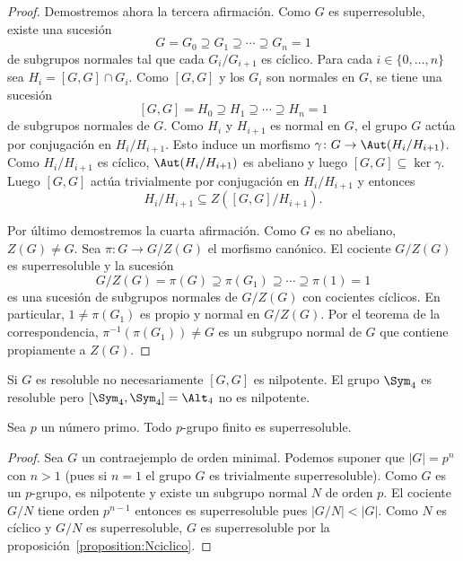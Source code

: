 \begin{proof}
	Demostremos ahora la tercera afirmación. Como $G$ es superresoluble, existe
	una sucesión
	\[
	G=G_0\supseteq G_1\supseteq\cdots\supseteq G_n=1
	\]
	de subgrupos normales tal que cada $G_i/G_{i+1}$ es cíclico. Para cada
	$i\in\{0,\dots,n\}$ sea $H_i=[G,G]\cap G_i$. Como $[G,G]$ y los $G_i$ son
	normales en $G$, se tiene una sucesión
	\[
	[G,G]=H_0\supseteq H_1\supseteq\cdots\supseteq H_n=1
	\]
	de subgrupos normales de $G$. Como $H_i$ y $H_{i+1}$ es normal en $G$, el
	grupo $G$ actúa por conjugación en $H_i/H_{i+1}$. Esto induce un morfismo
	$\gamma\colon G\to\Aut(H_i/H_{i+1})$. Como $H_i/H_{i+1}$ es cíclico, 
	$\Aut(H_i/H_{i+1})$ es abeliano y luego $[G,G]\subseteq\ker \gamma$. Luego
	$[G,G]$ actúa trivialmente por conjugación en $H_{i}/H_{i+1}$ y entonces
	\[
	H_i/H_{i+1}\subseteq Z([G,G]/H_{i+1}).
	\]

	Por último demostremos la cuarta afirmación. Como $G$ es no abeliano,
	$Z(G)\ne G$. Sea $\pi\colon G\to G/Z(G)$ el morfismo canónico.  El cociente
	$G/Z(G)$ es superresoluble y la sucesión
	\[
	G/Z(G)=\pi(G)\supseteq \pi(G_1)\supseteq\cdots\supseteq \pi(1)=1
	\]
	es una sucesión de subgrupos normales de $G/Z(G)$ con cocientes cíclicos.
	En particular, $1\ne \pi(G_1)$ es propio y normal en $G/Z(G)$.  Por el
	teorema de la correspondencia, $\pi^{-1}(\pi(G_1))\ne G$ es un subgrupo normal
	de $G$ que contiene propiamente a $Z(G)$. 
\end{proof}

\begin{example}
	Si $G$ es resoluble no necesariamente $[G,G]$ es nilpotente. El grupo
	$\Sym_4$ es resoluble pero $[\Sym_4,\Sym_4]=\Alt_4$ no es nilpotente.
\end{example}

\begin{proposition}
	\label{proposition:psuper}
	Sea $p$ un número primo.  Todo $p$-grupo finito es superresoluble.
\end{proposition}

\begin{proof}
	Sea $G$ un contraejemplo de orden minimal. Podemos suponer que $|G|=p^n$
	con $n>1$ (pues si $n=1$ el grupo $G$ es trivialmente superresoluble).
	Como $G$ es un $p$-grupo, es nilpotente  y existe un subgrupo normal $N$ de
	orden $p$. El cociente $G/N$ tiene orden $p^{n-1}$ entonces es
	superresoluble pues $|G/N|<|G|$. Como $N$ es cíclico y $G/N$ es
	superresoluble, $G$ es superresoluble por la
	proposición~\ref{proposition:Nciclico}.
\end{proof}

